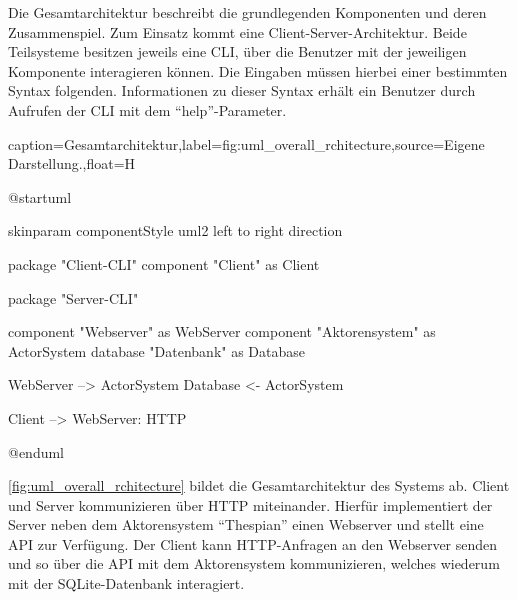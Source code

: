 Die Gesamtarchitektur beschreibt die grundlegenden Komponenten und deren Zusammenspiel.
Zum Einsatz kommt eine Client-Server-Architektur.
Beide Teilsysteme besitzen jeweils eine \ac{CLI}, über die Benutzer mit der jeweiligen Komponente interagieren können.
Die Eingaben müssen hierbei einer bestimmten Syntax folgenden.
Informationen zu dieser Syntax erhält ein Benutzer durch Aufrufen der \ac{CLI} mit dem \enquote{help}-Parameter.

\begin{dhbwfigure}{caption=Gesamtarchitektur,label=fig:uml_overall_rchitecture,source={Eigene Darstellung.},float=H}
    \begin{plantuml}
        @startuml

            skinparam componentStyle uml2
            left to right direction

            package "Client-CLI" {
                component "Client" as Client
            }

            package "Server-CLI" {
                component "Webserver" as WebServer
                component "Aktorensystem" as ActorSystem
                database "Datenbank" as Database

                WebServer --> ActorSystem
                Database <- ActorSystem
            }

            Client --> WebServer: HTTP

        @enduml
    \end{plantuml}
\end{dhbwfigure}\unskip

\autoref{fig:uml_overall_rchitecture} bildet die Gesamtarchitektur des Systems ab.
Client und Server kommunizieren über \ac{HTTP} miteinander.
Hierfür implementiert der Server neben dem Aktorensystem \enquote{Thespian} einen Webserver und stellt eine \ac{API} zur Verfügung. %
Der Client kann \ac{HTTP}-Anfragen an den Webserver senden und so über die \ac{API} mit dem Aktorensystem kommunizieren, welches wiederum mit der SQLite-Datenbank interagiert. %

